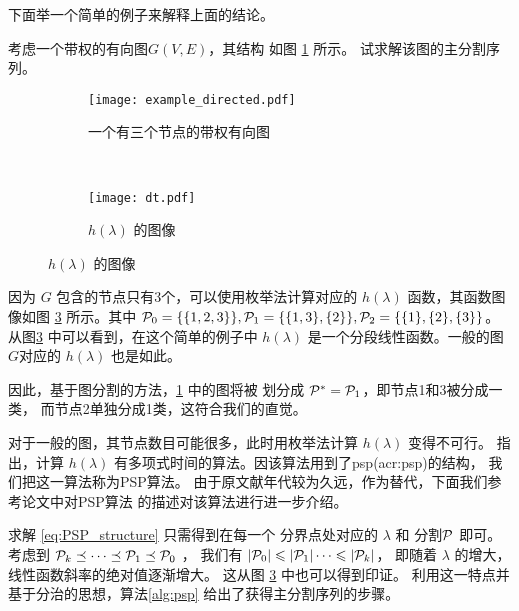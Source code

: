 下面举一个简单的例子来解释上面的结论。
\begin{example}\label{ex:psp}
考虑一个带权的有向图$G(V,E)$，其结构
如图 \ref{fig:example_directed} 所示。
试求解该图的主分割序列。
\end{example}
\begin{figure}
  \centering
  \begin{subfigure}[b]{0.4\linewidth}
  \texttt{[image: example\_directed.pdf]}
  \caption{一个有三个节点的带权有向图}
  \label{fig:example_directed}
  \end{subfigure}~
  \begin{subfigure}[b]{0.5\linewidth}
    \texttt{[image: dt.pdf]}
    \caption{$h(\lambda)$ 的图像}
    \label{fig:dt}
    \end{subfigure}  
\end{figure}

因为
$G$ 包含的节点只有3个，可以使用枚举法计算对应的 $h(\lambda)$
函数，其函数图像如图 \ref{fig:dt} 所示。其中
$\P_0=\{ \{1,2,3\} \}, \P_1 = \{\{1,3\}, \{2\} \},
\P_2 =\{\{1\},\{2\},\{3\} \}$。
从图\ref{fig:dt} 中可以看到，在这个简单的例子中
$h(\lambda)$
是一个分段线性函数。一般的图$G$对应的
$h(\lambda)$ 也是如此。

因此，基于图分割的方法，\ref{fig:example_directed}
中的图将被 划分成 $\P^*=\P_1$，即节点1和3被分成一类，
而节点2单独分成1类，这符合我们的直觉。

对于一般的图，其节点数目可能很多，此时用枚举法计算
$h(\lambda)$ 变得不可行。\citet{narayanan} 指出，计算
$h(\lambda)$ 有多项式时间的算法。因该算法用到了\gls{psp}(\gls{acr:psp})的结构，
我们把这一算法称为PSP算法。
由于原文献年代较为久远，作为替代，下面我们参考\citet{mac}论文中对PSP算法
的描述对该算法进行进一步介绍。

求解 \eqref{eq:PSP_structure} 只需得到在每一个
分界点处对应的 $\lambda$ 和 分割$\P$ 即可。
考虑到 $\P_k \preceq \dots \preceq \P_1 \preceq \P_0$
，
我们有 $|\P_0| \leq |\P_1| \dots \leq |\P_k|$，
即随着 $\lambda $ 的增大，线性函数斜率的绝对值逐渐增大。
这从图 \ref{fig:dt} 中也可以得到印证。
利用这一特点并基于分治的思想，算法\ref{alg:psp}
给出了获得主分割序列的步骤。

\renewcommand{\algorithmicrequire}{\textbf{输入：}\unskip}
\renewcommand{\algorithmicensure}{\textbf{输出：}\unskip}

